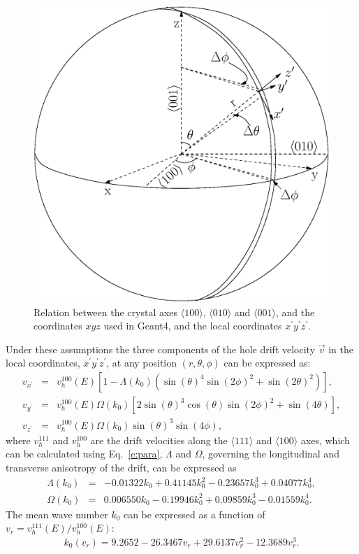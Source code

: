 \documentclass[epj]{svjour}
\begin{document}
\begin{figure}[htpb]
\centering
\includegraphics[width=0.8\linewidth]{vsphere}   
\caption{Relation between the crystal axes $\langle100\rangle$,
$\langle010\rangle$ and $\langle001\rangle$, and the coordinates $xyz$
used in Geant4, and the local coordinates
$x^{\prime}y^{\prime}z^{\prime}$.}
\label{f:vsphere} 
\end{figure} 

Under these assumptions the three components of the hole drift
velocity $\vec{v}$ in the local coordinates, $x^{\prime} y^{\prime}
z^{\prime}$, at any position $(r, \theta, \phi)$ can be expressed as:
\begin{eqnarray*} 
\label{e:vsphere} 
v_{x^{\prime}} &=& v^{100}_{h}(E)
[1-\Lambda(k_{0})(\sin(\theta)^{4}\sin(2\phi)^{2} + \sin(2\theta)^{2})],\\ 
v_{y^{\prime}} &=& v^{100}_{h}(E)\Omega(k_{0})
[2\sin(\theta)^{3}\cos(\theta)\sin(2\phi)^{2} + \sin(4\theta)],\\ 
v_{z^{\prime}} &=& v^{100}_{h}(E)\Omega(k_{0})\sin(\theta)^{3}\sin(4\phi), 
\end{eqnarray*} 
where $v^{111}_{h}$ and $v^{100}_{h}$ are the drift velocities along
the $\langle 111 \rangle$ and $\langle 100 \rangle$ axes, which can be
calculated using Eq.~\ref{e:para}, $\Lambda$ and $\Omega$, governing
the longitudinal and transverse anisotropy of the drift, can be
expressed as
\begin{eqnarray*} 
\label{e:lamb} 
\Lambda(k_{0}) &=& -0.01322k_{0} + 0.41145k_{0}^{2} - 0.23657k_{0}^{3} + 0.04077k_{0}^{4},\\
\Omega(k_{0}) &=& 0.006550k_{0} - 0.19946k_{0}^{2} + 0.09859k_{0}^{3} - 0.01559k_{0}^{4}. 
\end{eqnarray*} 
The mean wave number $k_{0}$ can be expressed as a function of
$v_{r} = v^{111}_{h}(E)/v^{100}_{h}(E)$:
\begin{eqnarray*} 
\label{e:k0} 
k_{0}(v_{r}) = 9.2652 - 26.3467v_{r} + 29.6137v_{r}^{2} - 12.3689v_{r}^{3}. 
\end{eqnarray*} 
 
\end{document}
